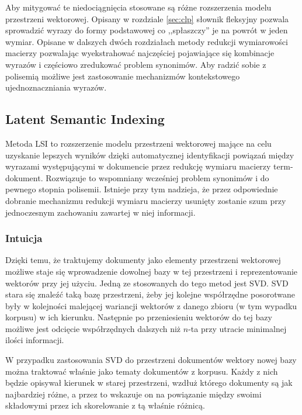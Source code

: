 \documentclass[11pt,a4paper]{article}
\begin{document}
Aby mitygować te niedociągnięcia stosowane są różne rozszerzenia modelu
przestrzeni wektorowej. Opisany w rozdziale \ref{sec:clp} słownik fleksyjny
pozwala sprowadzić wyrazy do formy podstawowej co ,,spłaszczy'' je na powrót w
jeden wymiar. Opisane w dalszych dwóch rozdziałach metody redukcji wymiarowości
macierzy pozwalając wyekstrahować najczęściej pojawiające się kombinacje
wyrazów i częściowo zredukować problem synonimów. Aby radzić sobie z polisemią
możliwe jest zastosowanie mechanizmów kontekstowego ujednoznaczniania wyrazów.

\FloatBarrier

\subsection{Latent Semantic Indexing}

Metoda LSI to rozszerzenie modelu przestrzeni wektorowej mające na celu
uzyskanie lepszych wyników dzięki automatycznej identyfikacji powiązań między
wyrazami występującymi w dokumencie przez redukcję wymiaru macierzy
term-dokument. Rozwiązuje to wspomniany wcześniej problem synonimów i do
pewnego stopnia polisemii.  Istnieje przy tym nadzieja, że przez odpowiednie
dobranie mechanizmu redukcji wymiaru macierzy usunięty zostanie szum przy
jednoczesnym zachowaniu zawartej w niej informacji.

\subsubsection{Intuicja}

Dzięki temu, że traktujemy dokumenty jako elementy przestrzeni wektorowej
możliwe staje się wprowadzenie dowolnej bazy w tej przestrzeni i
reprezentowanie wektorów przy jej użyciu. Jedną ze stosowanych do tego metod
jest SVD. SVD stara się znaleźć taką bazę przestrzeni, żeby jej kolejne
współrzędne posorotwane były w kolejności malejącej wariancji wektorów z danego
zbioru (w tym wypadku korpusu) w ich kierunku. Następnie po przeniesieniu
wektorów do tej bazy możliwe jest odcięcie współrzędnych dalszych niż $n$-ta
przy utracie minimalnej ilości informacji.

W przypadku zastosowania SVD do przestrzeni dokumentów wektory nowej bazy można
traktować właśnie jako tematy dokumentów z korpusu. Każdy z nich będzie
opisywał kierunek w starej przestrzeni, wzdłuż którego dokumenty są jak
najbardziej różne, a przez to wskazuje on na powiązanie między swoimi
składowymi przez ich skorelowanie z tą właśnie różnicą.
\end{document}
